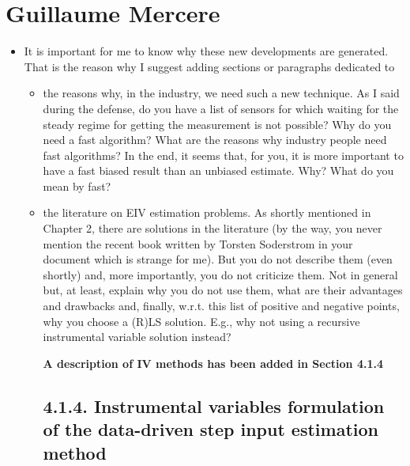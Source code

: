 \documentclass[11pt]{article}
\begin{document}
\section*{Guillaume Mercere}

\begin{itemize}
	\item It is important for me to know why these new developments are generated. That is the reason why I suggest adding sections or paragraphs dedicated to
    \begin{itemize}
        \item the reasons why, in the industry, we need such a new technique. As I said during the defense, do you have a list of sensors for which waiting for the steady regime for getting the measurement is not possible? Why do you need a fast algorithm? What are the reasons why industry people need fast algorithms? In the end, it seems that, for you, it is more important to have a fast biased result than an unbiased estimate. Why? What do you mean by fast?
        \item  the literature on EIV estimation problems. As shortly mentioned in Chapter 2, there are solutions in the literature (by the way, you never mention the recent book written by Torsten Soderstrom in your document which is strange for me). But you do not describe them (even shortly) and, more importantly, you do not criticize them. Not in general but, at least, explain why you do not use them, what are their advantages and drawbacks and, finally, w.r.t. this list of positive and negative points, why you choose a (R)LS solution. E.g., why not using a recursive instrumental variable solution instead?
        
        {\bfseries A description of IV methods has been added in Section 4.1.4}
        
        \color{blue}
    \subsection*{4.1.4. Instrumental variables formulation of the data-driven step input estimation method}


\end{itemize}
\end{itemize}
\end{document}
